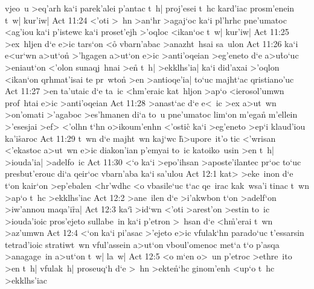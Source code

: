 vjeo~u
>eq'arh
ka`i
parek'alei
p'antac
t~h|
proj'esei
t~hc
kard'iac
prosm'enein
t~w|
kur'iw|\bibvsend
\vs Act 11:24
<'oti
>~hn
>an`hr
>agaj`oc
ka`i
pl'hrhc
pne'umatoc
<ag'iou
ka`i
p'istewc
ka`i
proset'ejh
>'oqloc
<ikan`oc
t~w|
kur'iw|\bibvsend
\vs Act 11:25
>ex~hljen
d`e
e>ic
tars`on
<o\r{}
vbarn'abac
>anazht~hsai
sa~ulon\bibvsend
\vs Act 11:26
ka`i
e<ur`wn
a>ut`on\r{}
>'hgagen
a>ut`on
e>ic
>anti'oqeian
>eg'eneto
d`e
a>u\r{t}o`uc
>eniaut`on
<'olon
sunaqj~hnai
>e\r{n}
t~h|
>ekklhs'ia|
ka`i
did'axai
>'oqlon
<ikan`on
qrhmat'isai
te
pr~wto\r{n}
>en
>antioqe'ia|
to`uc
majht`ac
qristiano'uc\bibvsend
\vs Act 11:27
>en
ta'utaic
d`e
ta~ic
<hm'eraic
kat~hljon
>ap`o
<ierosol'umwn
prof~htai
e>ic
>anti'oqeian\bibvsend
\vs Act 11:28
>anast`ac
d`e
e<~ic
>ex
a>ut~wn
>on'omati
>'agaboc
>es'hmanen
di`a
to~u
pne'umatoc
lim`on
m'ega\r{n}
m'ellein
>'esesjai
>ef>
<'olhn
t`hn
o>ikoum'enhn
<'ostic\r{}
ka`i
>eg'eneto
>ep`i
klaud'iou
ka'i\r{s}aroc\bibvsend
{}
\vs Act 11:29
t~wn
d`e
majht~wn
kaj`wc
\r{h}>upore~it'o
tic
<'wrisan
<'ekastoc
a>ut~wn
e>ic
diakon'ian
p'emyai
to~ic
katoiko~usin
>en
t~h|
>iouda'ia|
>adelfo~ic\bibvsend
\vs Act 11:30
<`o
ka`i
>epo'ihsan
>aposte'ilantec
pr`oc
to`uc
presbut'erouc
di`a
qeir`oc
vbarn'aba
ka`i
sa'ulou\bibvsend
\vs Act 12:1
kat>
>eke~inon
d`e
t`on
kair`on
>ep'ebalen
<hr'wdhc
<o
vbasile`uc
t`ac
qe~irac
kak~wsa'i
tinac
t~wn
>ap`o
t~hc
>ekklhs'iac\bibvsend
\vs Act 12:2
>ane~ilen
d`e
>i'akwbon
t`on
>adelf`on
>iw'annou
maqa'i\r{r}a|\bibvsend
{}
\vs Act 12:3
ka`i\r{}
>id`wn
<'oti
>arest'on
>estin
to~ic
>iouda'ioic
pros'ejeto
sullabe~in
ka`i
p'etron
>~hsan
d`e
<h\r{m}'erai
t~wn
>az'umwn\bibvsend
\vs Act 12:4
<`on
ka`i
pi'asac
>'ejeto
e>ic
vfulak`hn
parado`uc
t'essarsin
tetrad'ioic
stratiwt~wn
vful'assein
a>ut`on
vboul'omenoc
met`a
t`o
p'asqa
>anagage~in
a>ut`on
t~w|
la~w|\bibvsend
\vs Act 12:5
<o
m`en
o>~un
p'etroc
>ethre~ito
>en
t~h|
vfulak~h|
proseuq`h
d`e
>~hn
>ekte\r{n}`hc
ginom'enh
<up`o
t~hc
>ekklhs'iac
